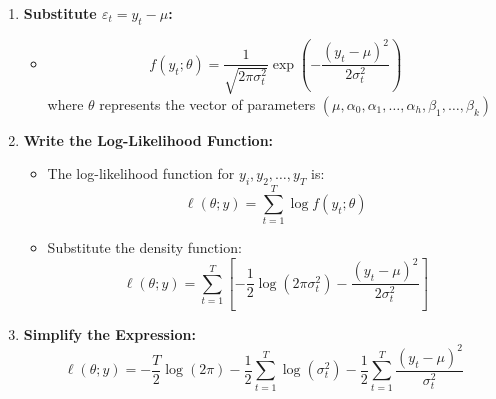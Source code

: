 \begin{footnotesize}
\begin{enumerate}
    \item \textbf{Substitute $\varepsilon_t = y_t -\mu$:}
    \begin{itemize}
        \item \[
        f(y_t;\theta)=\frac{1}{\sqrt{2\pi \sigma_t^2}} \exp\left(-\frac{(y_t-\mu)^2}{2\sigma_t^2}\right)
        \] where $\theta$ represents the vector of parameters $(\mu,\alpha_0, \alpha_1,\ldots,\alpha_h,\beta_1,\ldots,\beta_k)$
    \end{itemize}
    \item \textbf{Write the Log-Likelihood Function:}
    \begin{itemize}
        \item The log-likelihood function for $y_i,y_2,\ldots,y_T$ is:\[
        \ell(\theta;y) = \sum_{t=1}^T \log f(y_t;\theta)
        \]
        \item Substitute the density function: \[
        \ell(\theta;y) = \sum_{t=1}^T \left[ -\frac{1}{2} \log (2\pi \sigma_t^2)-\frac{(y_t-\mu)^2}{2\sigma_t^2} \right]
        \]
    \end{itemize}
    \item \textbf{Simplify the Expression:}
    \[
    \ell(\theta;y) = -\frac{T}{2} \log(2\pi) -\frac{1}{2} \sum_{t=1}^T \log (\sigma_t^2)-\frac{1}{2} \sum_{t=1}^T \frac{(y_t-\mu)^2}{\sigma_t^2}
    \]
\end{enumerate}




\end{footnotesize}
